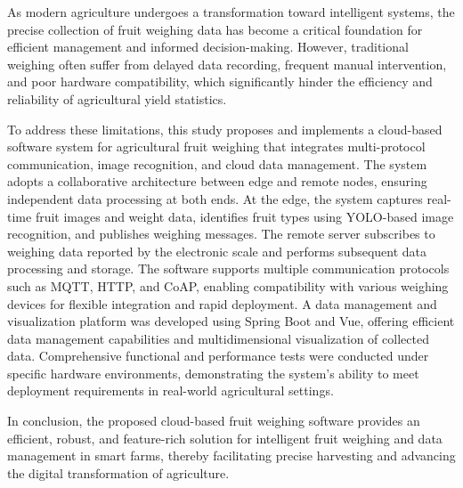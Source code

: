 As modern agriculture undergoes a transformation toward intelligent systems, the precise collection of fruit weighing data has become a critical foundation for efficient management and informed decision-making. However, traditional weighing often suffer from delayed data recording, frequent manual intervention, and poor hardware compatibility, which significantly hinder the efficiency and reliability of agricultural yield statistics.

To address these limitations, this study proposes and implements a cloud-based software system for agricultural fruit weighing that integrates multi-protocol communication, image recognition, and cloud data management. The system adopts a collaborative architecture between edge and remote nodes, ensuring independent data processing at both ends. At the edge, the system captures real-time fruit images and weight data, identifies fruit types using YOLO-based image recognition, and publishes weighing messages. The remote server subscribes to weighing data reported by the electronic scale and performs subsequent data processing and storage. The software supports multiple communication protocols such as MQTT, HTTP, and CoAP, enabling compatibility with various weighing devices for flexible integration and rapid deployment. A data management and visualization platform was developed using Spring Boot and Vue, offering efficient data management capabilities and multidimensional visualization of collected data. Comprehensive functional and performance tests were conducted under specific hardware environments, demonstrating the system’s ability to meet deployment requirements in real-world agricultural settings.

In conclusion, the proposed cloud-based fruit weighing software provides an efficient, robust, and feature-rich solution for intelligent fruit weighing and data management in smart farms, thereby facilitating precise harvesting and advancing the digital transformation of agriculture.
